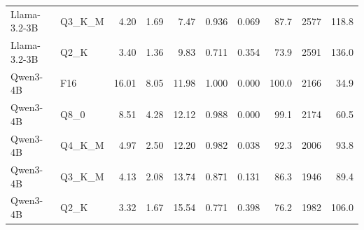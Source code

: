 \begin{table}[htbp]
\begin{tabular}{llrrrrrrrr}
Llama-3.2-3B & Q3_K_M & 4.20 & 1.69 & 7.47 & 0.936 & 0.069 & 87.7 & 2577 & 118.8 \\
Llama-3.2-3B & Q2_K & 3.40 & 1.36 & 9.83 & 0.711 & 0.354 & 73.9 & 2591 & 136.0 \\
Qwen3-4B & F16 & 16.01 & 8.05 & 11.98 & 1.000 & 0.000 & 100.0 & 2166 & 34.9 \\
Qwen3-4B & Q8_0 & 8.51 & 4.28 & 12.12 & 0.988 & 0.000 & 99.1 & 2174 & 60.5 \\
Qwen3-4B & Q4_K_M & 4.97 & 2.50 & 12.20 & 0.982 & 0.038 & 92.3 & 2006 & 93.8 \\
Qwen3-4B & Q3_K_M & 4.13 & 2.08 & 13.74 & 0.871 & 0.131 & 86.3 & 1946 & 89.4 \\
Qwen3-4B & Q2_K & 3.32 & 1.67 & 15.54 & 0.771 & 0.398 & 76.2 & 1982 & 106.0 \\
\bottomrule
\end{tabular}
\end{table}
